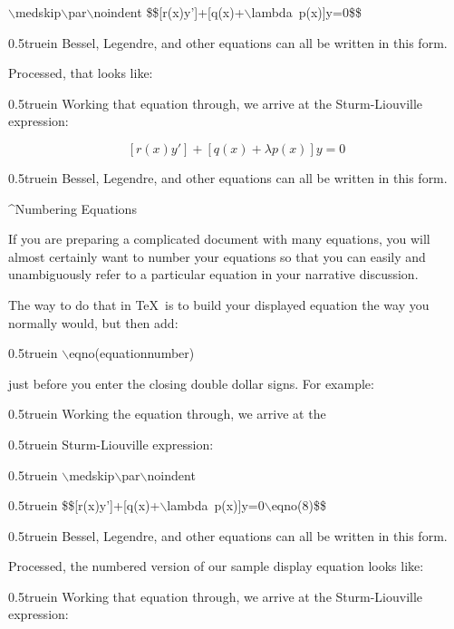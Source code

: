 {\twltt $\backslash$medskip$\backslash$par$\backslash$noindent}
{\twltt \$\$[r(x)y']+[q(x)+$\backslash$lambda\ p(x)]y=0\$\$}
\par\noindent\hglue 0.5truein
{\twltt Bessel, Legendre, and other equations can all be written in this form.}
\vfill\eject
\par\noindent
Processed, that looks like:
\bigskip\par\noindent\hglue 0.5truein
Working that equation through, we arrive at the Sturm-Liouville expression:
\medskip\par\noindent
$$[r(x)y']+[q(x)+\lambda p(x)]y=0$$
\par\noindent\hglue 0.5truein
Bessel, Legendre, and other equations can all be written in this form.
\bigskip\bigskip\par\noindent
\centerline{\twlbf ^{Numbering Equations}}
\bigskip\par\noindent
If you are preparing a complicated document with many equations, you will
almost certainly want to number your equations so that you can easily and
unambiguously refer to a particular equation in your narrative discussion.
\bigskip\par\noindent
The way to do that in \TeX\ is to build your displayed equation the way you
normally would, but then add:
\bigskip\par\noindent\hglue 0.5truein
{\twltt $\backslash$eqno({\twlit equationnumber})}
\bigskip\par\noindent
just before you enter the closing double dollar signs. For example:
\bigskip\par\noindent\hglue 0.5truein
{\twltt Working the equation through, we arrive at the }
\par\noindent\hglue 0.5truein
{\twltt Sturm-Liouville expression:}
\par\noindent\hglue 0.5truein
{\twltt $\backslash$medskip$\backslash$par$\backslash$noindent}
\par\noindent\hglue 0.5truein
{\twltt \$\$[r(x)y']+[q(x)+$\backslash$lambda\ p(x)]y=0$\backslash$eqno(8)\$\$}
\par\noindent\hglue 0.5truein
{\twltt Bessel, Legendre, and other equations can all be written in this form.}
\bigskip\par\noindent
Processed, the numbered version of our sample display equation looks like:
\bigskip\par\noindent\hglue 0.5truein
Working that equation through, we arrive at the Sturm-Liouville expression:

